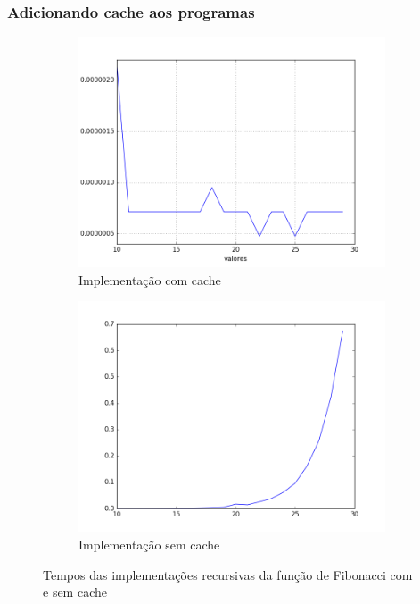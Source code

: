 \documentclass[aspectratio=169]{beamer}
\begin{document}
\begin{frame}
	\frametitle{Adicionando cache aos programas}
	\begin{figure}
		\centering
		\begin{subfigure}{.5\textwidth}
		  \centering
		  \includegraphics[width=.95\linewidth]{python_imgs/test_cache}
		  \caption{Implementação com cache}
		  \label{fig:sub1}
		\end{subfigure}%
		\begin{subfigure}{.5\textwidth}
		  \centering
		  \includegraphics[width=.95\linewidth]{python_imgs/test_rec}
		  \caption{Implementação sem cache}
		  \label{fig:sub2}
		\end{subfigure}
		\caption{Tempos das implementações recursivas da função de Fibonacci com e sem cache}
		\label{fig:test}
	\end{figure}
\end{frame}
\end{document}
